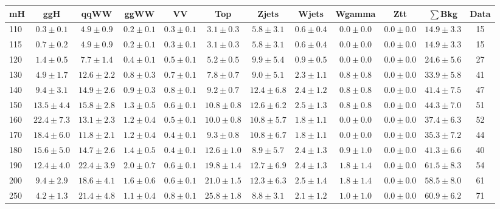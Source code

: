 \begin{table}[!ht]
{%
 \tiny
 \begin{center}
 \begin{tabular}{l c c c c c c c c c c c }
 \hline
 mH & ggH & qqWW & ggWW & VV & Top & Zjets & Wjets & Wgamma & Ztt & $\sum$Bkg & Data \\
 \hline
110 & $0.3\pm0.1$ & $4.9\pm0.9$ & $0.2\pm0.1$ & $0.3\pm0.1$ & $3.1\pm0.3$ & $5.8\pm3.1$ & $0.6\pm0.4$ & $0.0\pm0.0$ & $0.0\pm0.0$ & $14.9\pm3.3$ & 15 \\
115 & $0.7\pm0.2$ & $4.9\pm0.9$ & $0.2\pm0.1$ & $0.3\pm0.1$ & $3.1\pm0.3$ & $5.8\pm3.1$ & $0.6\pm0.4$ & $0.0\pm0.0$ & $0.0\pm0.0$ & $14.9\pm3.3$ & 15 \\
120 & $1.4\pm0.5$ & $7.7\pm1.4$ & $0.4\pm0.1$ & $0.5\pm0.1$ & $5.2\pm0.5$ & $9.9\pm5.4$ & $0.9\pm0.5$ & $0.0\pm0.0$ & $0.0\pm0.0$ & $24.6\pm5.6$ & 27 \\
130 & $4.9\pm1.7$ & $12.6\pm2.2$ & $0.8\pm0.3$ & $0.7\pm0.1$ & $7.8\pm0.7$ & $9.0\pm5.1$ & $2.3\pm1.1$ & $0.8\pm0.8$ & $0.0\pm0.0$ & $33.9\pm5.8$ & 41 \\
140 & $9.4\pm3.1$ & $14.9\pm2.6$ & $0.9\pm0.3$ & $0.8\pm0.1$ & $9.2\pm0.7$ & $12.4\pm6.8$ & $2.4\pm1.2$ & $0.8\pm0.8$ & $0.0\pm0.0$ & $41.4\pm7.5$ & 47 \\
150 & $13.5\pm4.4$ & $15.8\pm2.8$ & $1.3\pm0.5$ & $0.6\pm0.1$ & $10.8\pm0.8$ & $12.6\pm6.2$ & $2.5\pm1.3$ & $0.8\pm0.8$ & $0.0\pm0.0$ & $44.3\pm7.0$ & 51 \\
160 & $22.4\pm7.3$ & $13.1\pm2.3$ & $1.2\pm0.4$ & $0.5\pm0.1$ & $10.0\pm0.8$ & $10.8\pm5.7$ & $1.8\pm1.1$ & $0.0\pm0.0$ & $0.0\pm0.0$ & $37.4\pm6.3$ & 52 \\
170 & $18.4\pm6.0$ & $11.8\pm2.1$ & $1.2\pm0.4$ & $0.4\pm0.1$ & $9.3\pm0.8$ & $10.8\pm6.7$ & $1.8\pm1.1$ & $0.0\pm0.0$ & $0.0\pm0.0$ & $35.3\pm7.2$ & 44 \\
180 & $15.6\pm5.0$ & $14.7\pm2.6$ & $1.4\pm0.5$ & $0.4\pm0.1$ & $12.6\pm1.0$ & $8.9\pm5.7$ & $2.4\pm1.3$ & $0.9\pm1.0$ & $0.0\pm0.0$ & $41.3\pm6.6$ & 40 \\
190 & $12.4\pm4.0$ & $22.4\pm3.9$ & $2.0\pm0.7$ & $0.6\pm0.1$ & $19.8\pm1.4$ & $12.7\pm6.9$ & $2.4\pm1.3$ & $1.8\pm1.4$ & $0.0\pm0.0$ & $61.5\pm8.3$ & 54 \\
200 & $9.4\pm2.9$ & $18.6\pm4.1$ & $1.6\pm0.6$ & $0.6\pm0.1$ & $21.0\pm1.5$ & $12.3\pm6.3$ & $2.5\pm1.4$ & $1.8\pm1.4$ & $0.0\pm0.0$ & $58.5\pm8.0$ & 61 \\
250 & $4.2\pm1.3$ & $21.4\pm4.8$ & $1.1\pm0.4$ & $0.8\pm0.1$ & $25.8\pm1.8$ & $8.8\pm3.1$ & $2.1\pm1.2$ & $1.0\pm1.0$ & $0.0\pm0.0$ & $60.9\pm6.2$ & 71 \\

\end{tabular}
\end{center}}
\end{table}
